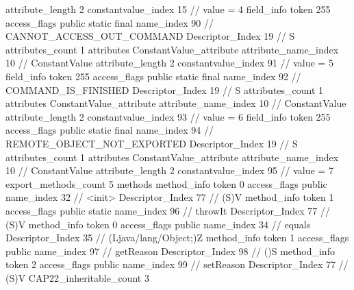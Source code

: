 {{{{{{{					attribute_length	2
					constantvalue_index	15		// value = 4
				}
				}
			}
			field_info {
				token	255
				access_flags	public static final
				name_index	90		// CANNOT_ACCESS_OUT_COMMAND
				Descriptor_Index	19		// S
				attributes_count	1
				attributes {
				ConstantValue_attribute {
					attribute_name_index	10		// ConstantValue
					attribute_length	2
					constantvalue_index	91		// value = 5
				}
				}
			}
			field_info {
				token	255
				access_flags	public static final
				name_index	92		// COMMAND_IS_FINISHED
				Descriptor_Index	19		// S
				attributes_count	1
				attributes {
				ConstantValue_attribute {
					attribute_name_index	10		// ConstantValue
					attribute_length	2
					constantvalue_index	93		// value = 6
				}
				}
			}
			field_info {
				token	255
				access_flags	public static final
				name_index	94		// REMOTE_OBJECT_NOT_EXPORTED
				Descriptor_Index	19		// S
				attributes_count	1
				attributes {
				ConstantValue_attribute {
					attribute_name_index	10		// ConstantValue
					attribute_length	2
					constantvalue_index	95		// value = 7
				}
				}
			}
			}
			export_methods_count	5
			methods {
				method_info {
					token	0
					access_flags	public
					name_index	32		// <init>
					Descriptor_Index	77		// (S)V
				}
				method_info {
					token	1
					access_flags	public static
					name_index	96		// throwIt
					Descriptor_Index	77		// (S)V
				}
				method_info {
					token	0
					access_flags	public
					name_index	34		// equals
					Descriptor_Index	35		// (Ljava/lang/Object;)Z
				}
				method_info {
					token	1
					access_flags	public
					name_index	97		// getReason
					Descriptor_Index	98		// ()S
				}
				method_info {
					token	2
					access_flags	public
					name_index	99		// setReason
					Descriptor_Index	77		// (S)V
				}
			}
			CAP22_inheritable_count	3
		}
	}
}
